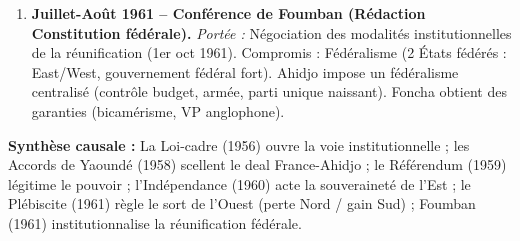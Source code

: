 \documentclass[11pt]{article}
\newcommand{\cle}[1]{{\popxbold\color{popdark}#1}}
\begin{document}
\begin{exoresolu}
\begin{enumerate}
    \emph{Portée :} \cle{Choix démocratique} imposé par l'ONU (Rés. 1352). Deux questions distinctes :
    \begin{itemize}
        \item Nord : Intégration au Nigeria (60\% OUI) \rightarrow Perte pour la réunification.
        \item Sud : Réunification avec la République du Cameroun (70\% OUI) \rightarrow Victoire de l'option Foncha/KNDP (soutenue par Ahidjo/ONU) contre Endeley/KNC (intégration Nigeria).
    \end{itemize}
    \item \textbf{Juillet-Août 1961 -- Conférence de Foumban (Rédaction Constitution fédérale).}
    \emph{Portée :} Négociation des \cle{modalités institutionnelles} de la réunification (1er oct 1961). Compromis : \cle{Fédéralisme} (2 États fédérés : East/West, gouvernement fédéral fort). Ahidjo impose un fédéralisme \guillemotleft centralisé \guillemotright (contrôle budget, armée, parti unique naissant). Foncha obtient des garanties (bicamérisme, VP anglophone).
\end{enumerate}

\textbf{Synthèse causale :} La \cle{Loi-cadre (1956)} ouvre la voie institutionnelle ; les \cle{Accords de Yaoundé (1958)} scellent le deal France-Ahidjo ; le \cle{Référendum (1959)} légitime le pouvoir ; l'\cle{Indépendance (1960)} acte la souveraineté de l'Est ; le \cle{Plébiscite (1961)} règle le sort de l'Ouest (perte Nord / gain Sud) ; \cle{Foumban (1961)} institutionnalise la réunification fédérale.
\end{exoresolu}
\end{document}
